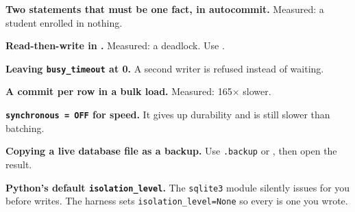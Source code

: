 \begin{pitfall}
\begin{tight}
  \item \textbf{Two statements that must be one fact, in autocommit.} Measured:
        a student enrolled in nothing.
  \item \textbf{Read-then-write in .} Measured: a
        deadlock. Use .
  \item \textbf{Leaving \texttt{busy\_timeout} at 0.} A second writer is
        refused instead of waiting.
  \item \textbf{A commit per row in a bulk load.} Measured: 165$\times$ slower.
  \item \textbf{\texttt{synchronous = OFF} for speed.} It gives up durability
        and is still slower than batching.
  \item \textbf{Copying a live database file as a backup.} Use
        \texttt{.backup} or , then open the result.
  \item \textbf{Python's default \texttt{isolation\_level}.} The
        \texttt{sqlite3} module silently issues  for you before
        writes. The harness sets \texttt{isolation\_level=None} so every
         is one you wrote.
\end{tight}
\end{pitfall}

